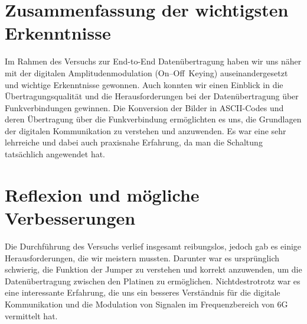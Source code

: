 \section{Zusammenfassung der wichtigsten Erkenntnisse}
Im Rahmen des Versuchs zur End-to-End Datenübertragung haben wir uns näher mit der digitalen Amplitudenmodulation (On--Off~Keying) auseinandergesetzt und wichtige Erkenntnisse gewonnen. 
Auch konnten wir einen Einblick in die Übertragungsqualität und die Herausforderungen bei der Datenübertragung über Funkverbindungen gewinnen. Die Konversion der Bilder in ASCII-Codes und deren Übertragung über die Funkverbindung ermöglichten es uns, die Grundlagen der digitalen Kommunikation zu verstehen und anzuwenden.
Es war eine sehr lehrreiche und dabei auch praxisnahe Erfahrung, da man die Schaltung tatsächlich angewendet hat.
\section{Reflexion und mögliche Verbesserungen}
Die Durchführung des Versuchs verlief insgesamt reibungslos, jedoch gab es einige Herausforderungen, die wir meistern mussten. Darunter war es ursprünglich schwierig, die Funktion
der Jumper zu verstehen und korrekt anzuwenden, um die Datenübertragung zwischen den Platinen zu ermöglichen. 
Nichtdestrotrotz war es eine interessante Erfahrung, die uns ein besseres Verständnis für die digitale Kommunikation und die Modulation von Signalen im Frequenzbereich von 6G vermittelt hat.
\clearpage